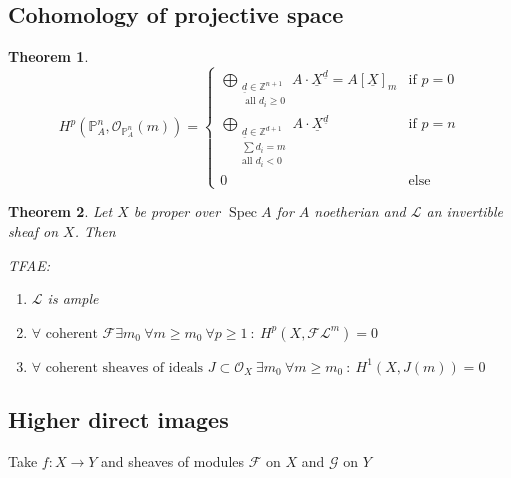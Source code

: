 \documentclass[a4paper, 12pt]{article}
\newcommand{\ca}[1]{\mathcal{#1}}
\newcommand{\caf}{\mathcal{F}}
\newcommand{\cag}{\mathcal{G}}
\newcommand{\ox}{\mathcal{O}_X}
\newtheorem*{thm}{Theorem}
\DeclareMathOperator{\spec}{Spec}
\begin{document}
	
	
	\subsection{Cohomology of projective space}
		
	\begin{thm}
		\[ 
		H^p(\mathbb{P}^n_A, \ca{O}_{\mathbb{P}^n_A}(m)) =
		\begin{cases}
		\underset{ \substack{ \underline{d} \in \mathbb{Z}^{n+1} \\ \text{ all } d_i \geq 0 } }{\bigoplus} A\cdot\underline{X}^{\underline{d}} = A[\underline{X}]_m & \text{if } p= 0 \\
		
		\underset{\substack{  \underline{d} \in \mathbb{Z}^{d+1} \\ \sum d_i = m \\ \text{all } d_i < 0  }}{\bigoplus}  A \cdot \underline{X}^{\underline{d}} & \text{if } p = n \\
		
		0 & \text{else}
		
		\end{cases}
		\]
	\end{thm}
	
	\begin{thm}
		Let $ X $ be proper over $ \spec A $ for $ A $ noetherian and $ \ca{L} $ an invertible sheaf on $ X $. Then
		
		TFAE:
		
		\begin{enumerate}
			\item $ \ca{L} $ is ample
			\item $ \forall \text{ coherent } \caf \exists m_0 \: \forall m \geq m_0 \: \forall p\geq 1 \: : \: H^p(X, \caf \ca{L}^m) =0 $
			\item $ \forall \text{ coherent sheaves of ideals } J \subset \ox \: \exists m_0 \: \forall m \geq m_0 \: :\: H^1 (X, J(m)) =0  $
		\end{enumerate}
	\end{thm}
	
	
	
	
	
	\subsection{Higher direct images}
	
	Take $ f:X \rightarrow Y $ and sheaves of modules $ \caf $ on $ X $ and $ \cag $ on $ Y $
	
\end{document}
